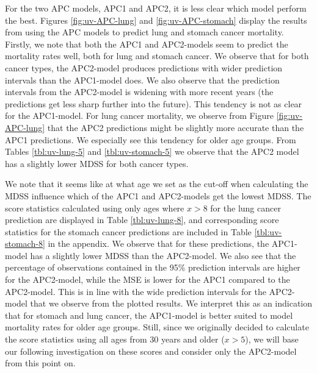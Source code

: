 \newpar For the two APC models, APC1 and APC2, it is less clear which model perform the best. Figures \ref{fig:uv-APC-lung} and \ref{fig:uv-APC-stomach} display the results from using the APC models to predict lung and stomach cancer mortality. Firstly, we note that both the APC1 and APC2-models seem to predict the mortality rates well, both for lung and stomach cancer. We observe that for both cancer types, the APC2-model produces predictions with wider prediction intervals than the APC1-model does. We also observe that the prediction intervals from the APC2-model is widening with more recent years (the predictions get less sharp further into the future). This tendency is not as clear for the APC1-model. For lung cancer mortality, we observe from Figure \ref{fig:uv-APC-lung} that the APC2 predictions might be slightly more accurate than the APC1 predictions. We especially see this tendency for older age groups. From Tables \ref{tbl:uv-lung-5} and \ref{tbl:uv-stomach-5} we observe that the APC2 model has a slightly lower MDSS for both cancer types.

\newpar We note that it seems like at what age we set as the cut-off when calculating the MDSS influence which of the APC1 and APC2-models get the lowest MDSS. The score statistics calculated using only ages where $x > 8$ for the lung cancer prediction are displayed in Table \ref{tbl:uv-lung-8}, and corresponding score statistics for the stomach cancer predictions are included in Table \ref{tbl:uv-stomach-8} in the appendix. We observe that for these predictions, the APC1-model has a slightly lower MDSS than the APC2-model. We also see that the percentage of observations contained in the 95\% prediction intervals are higher for the APC2-model, while the MSE is lower for the APC1 compared to the APC2-model. This is in line with the wide prediction intervals for the APC2-model that we observe from the plotted results. We interpret this as an indication that for stomach and lung cancer, the APC1-model is better suited to model mortality rates for older age groups. Still, since we originally decided to calculate the score statistics using all ages from 30 years and older ($x > 5$), we will base our following investigation on these scores and consider only the APC2-model from this point on. 

